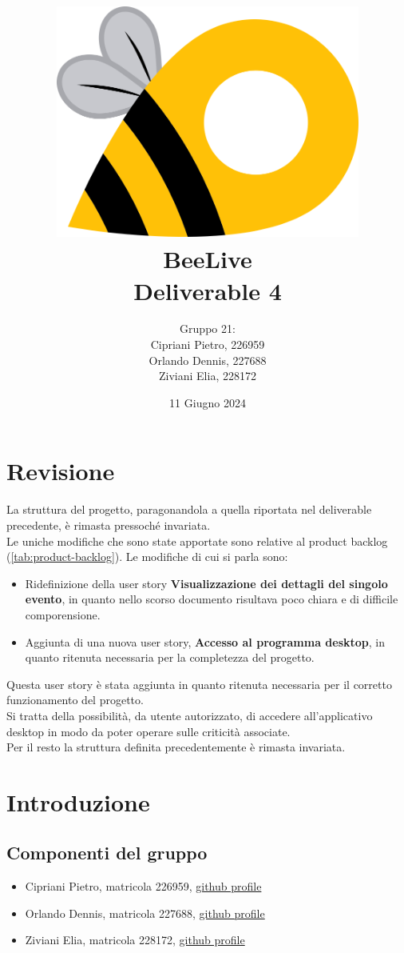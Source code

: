\documentclass{article}
\title{\includegraphics[width=0.75\textwidth]{Images/BeeLive-Logo.png}\\\vspace{100pt}
\LARGE{\textbf{BeeLive\\Deliverable 4}}}
\author{Gruppo 21:\\
Cipriani Pietro, 226959\\
Orlando Dennis, 227688\\
Ziviani Elia, 228172}
\date{11 Giugno 2024}
\begin{document}
\maketitle
\thispagestyle{firstpage} %
\clearpage

\pagestyle{nonplain} %

\renewcommand{\contentsname}{Indice}
\tableofcontents

\clearpage

\section{Revisione}
La struttura del progetto, paragonandola a quella riportata nel deliverable precedente, è rimasta pressoché invariata.\\
Le uniche modifiche che sono state apportate sono relative al product backlog (\ref{tab:product-backlog}).
Le modifiche di cui si parla sono:
\begin{itemize}
    \item Ridefinizione della user story \textbf{Visualizzazione dei dettagli del singolo evento}, in quanto nello scorso documento risultava poco chiara e di difficile comporensione.
    \item Aggiunta di una nuova user story, \textbf{Accesso al programma desktop}, in quanto ritenuta necessaria per la completezza del progetto.
\end{itemize}
Questa user story è stata aggiunta in quanto ritenuta necessaria per il corretto funzionamento del progetto.\\
Si tratta della possibilità, da utente autorizzato, di accedere all'applicativo desktop in modo da poter operare sulle criticità associate.\\
Per il resto la struttura definita precedentemente è rimasta invariata.

\clearpage

\section{Introduzione}

\subsection{Componenti del gruppo}
\begin{itemize}
    \item Cipriani Pietro, matricola 226959, \lbrack\href{https://github.com/pietrocipriani}{github profile}\rbrack
    \item Orlando Dennis, matricola 227688, \lbrack\href{https://github.com/dennisorlando}{github profile}\rbrack
    \item Ziviani Elia, matricola 228172, \lbrack\href{https://github.com/ELI20ZIVI}{github profile}\rbrack
\end{itemize}
\end{document}

